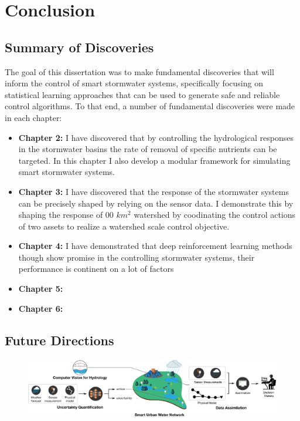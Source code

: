 \chapter{Conclusion}\label{ch:conclusion}
\section{Summary of Discoveries}

The goal of this dissertation was to make fundamental discoveries that will inform the control of smart stormwater systems, specifically focusing on statistical learning approaches that can be used to generate safe and reliable control algorithms.
To that end, a number of fundamental discoveries were made in each chapter: 

\begin{itemize}
	\item \textbf{Chapter 2:} I have discovered that by controlling the hydrological responses in the stormwater basins the rate of removal of specific nutrients can be targeted. In this chapter I also develop a modular framework for simulating smart stormwater systems.
	\item \textbf{Chapter 3:} I have discovered that the response of the stormwater systems can be precisely shaped by relying on the sensor data. I demonstrate this by shaping the response of 00 $km^2$ watershed by coodinating the control actions of two assets to realize a watershed scale control objective.
	\item \textbf{Chapter 4:} I have demonstrated that deep reinforcement learning methods though show promise in the controlling stormwater systems, their performance is continent on a lot of factors 
	\item \textbf{Chapter 5:}
	\item \textbf{Chapter 6:}
\end{itemize}
\section{Future Directions}

\begin{figure}[H]
	\centering
	\includegraphics[width=\textwidth]{gfx/rs_final.eps}
\end{figure}


